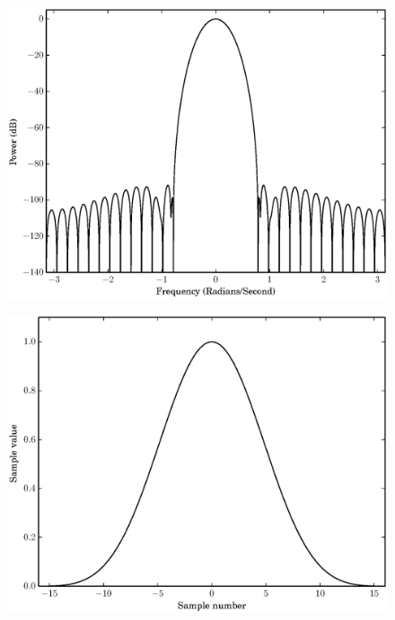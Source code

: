 \begin{figure}[!t]
    \centering
    \includegraphics[width=\figwidthscale\textwidth]{plots/min4_blackman_fd.eps}
    \CaptionWithTitle{%
    }{}
\end{figure}

\begin{figure}[!t]
    \centering
    \includegraphics[width=\figwidthscale\textwidth]{plots/c1_blackman_td.eps}
    \CaptionWithTitle{%
    }{}
\end{figure}

